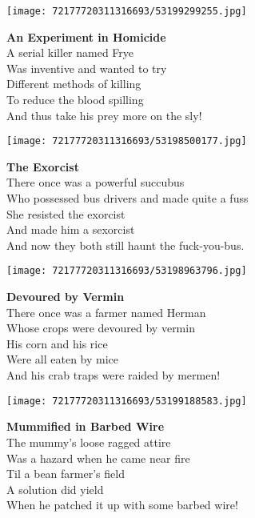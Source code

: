 \documentclass[10pt,letterpaper]{article}
\begin{document}
\begin{center}\texttt{[image: 72177720311316693/53199299255.jpg]}
\end{center}
\begin{center}
\textbf{An Experiment in Homicide}\\
\vskip 0.2in
A serial killer named Frye\\
Was inventive and wanted to try\\
Different methods of killing\\
To reduce the blood spilling\\
And thus take his prey more on the sly!\\
\end{center}
\pagebreak

\begin{center}
\texttt{[image: 72177720311316693/53198500177.jpg]}
\end{center}

\begin{center}
\textbf{The Exorcist}\\
\vskip 0.2in
There once was a powerful succubus\\
Who possessed bus drivers and made quite a fuss\\
She resisted the exorcist\\
And made him a sexorcist\\
And now they both still haunt the fuck-you-bus.\\
\end{center}
\pagebreak

\begin{center}\texttt{[image: 72177720311316693/53198963796.jpg]}
\end{center}
\begin{center}
\textbf{Devoured by Vermin}\\
\vskip 0.2in
There once was a farmer named Herman\\
Whose crops were devoured by vermin\\
His corn and his rice\\
Were all eaten by mice\\
And his crab traps were raided by mermen!\\
\end{center}
\pagebreak

\begin{center}\texttt{[image: 72177720311316693/53199188583.jpg]}
\end{center}
\begin{center}
\textbf{Mummified in Barbed Wire}\\
\vskip 0.2in
The mummy's loose ragged attire\\
Was a hazard when he came near fire\\
Til a bean farmer's field\\
A solution did yield\\
When he patched it up with some barbed wire!\\
\end{center}
\pagebreak
\end{document}
